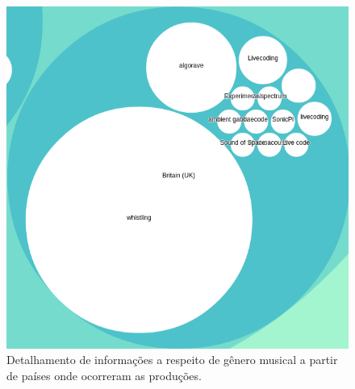 \begin{figure}
\begin{center}
\includegraphics[scale=0.6]{./imagens/zoomable_circle_packing_genre_year_livecoding4.png}
\caption{Detalhamento de informações a respeito de gênero musical a partir de países onde ocorreram as produções.}
\label{fig:pacotao4}
\end{center}
\end{figure}